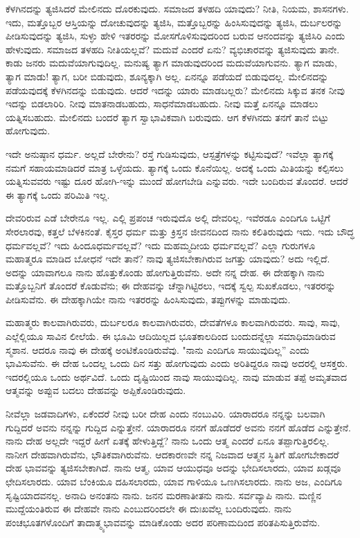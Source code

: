 ಕೆಳಗಿನದನ್ನು ತ್ಯಜಿಸಿದರೆ ಮೇಲಿನದು ದೊರಕುವುದು. ಸಮಾಜದ ತಳಹದಿ ಯಾವುದು? ನೀತಿ, ನಿಯಮ, ಶಾಸನಗಳು. ಇದು, ಮತ್ತೊಬ್ಬರ ಆಸ್ತಿಯನ್ನು ದೋಚುವುದನ್ನು ತ್ಯಜಿಸಿ, ಮತ್ತೊಬ್ಬರನ್ನು ಹಿಂಸಿಸುವುದನ್ನು ತ್ಯಜಿಸಿ, ದುರ್ಬಲರನ್ನು ಪೀಡಿಸುವುದನ್ನು ತ್ಯಜಿಸಿ, ಸುಳ್ಳು ಹೇಳಿ ಇತರರನ್ನು ಮೋಸಗೊಳಿಸುವುದರಿಂದ ಬರುವ ಆನಂದವನ್ನು ತ್ಯಜಿಸಿರಿ ಎಂದು ಹೇಳುವುದು. ಸಮಾಜದ ತಳಹದಿ ನೀತಿಯಲ್ಲವೆ? ಮದುವೆ ಎಂದರೆ ಏನು? ವ್ಯಭಿಚಾರವನ್ನು ತ್ಯಜಿಸುವುದು ತಾನೇ. ಕಾಡು ಜನರು ಮದುವೆಯಾಗುವುದಿಲ್ಲ. ಮನುಷ್ಯ ತ್ಯಾಗ ಮಾಡುವುದರಿಂದ ಮದುವೆಯಾಗುವನು. ತ್ಯಾಗ ಮಾಡು, ತ್ಯಾಗ ಮಾಡು! ತ್ಯಾಗ, ಬರೀ ಬಿಡುವುದು, ಶೂನ್ಯಕ್ಕಾಗಿ ಅಲ್ಲ. ಏನನ್ನೂ ಪಡೆಯದೆ ಬಿಡುವುದಲ್ಲ. ಮೇಲಿನದನ್ನು ಪಡೆಯವುದಕ್ಕೆ ಕೆಳಗಿನದನ್ನು ಬಿಡುವುದು. ಆದರೆ ಇದನ್ನು ಯಾರು ಮಾಡಬಲ್ಲರು? ಮೇಲಿನದು ಸಿಕ್ಕುವ ತನಕ ನೀವು ಇದನ್ನು ಬಿಡಲಾರಿರಿ. ನೀವು ಮಾತನಾಡಬಹುದು, ಸಾಧನೆಮಾಡಬಹುದು. ನೀವು ಮತ್ತೆ ಏನನ್ನೂ ಮಾಡಲು ಯತ್ನಿಸಬಹುದು. ಮೇಲಿನದು ಬಂದರೆ ತ್ಯಾಗ ಸ್ವಾಭಾವಿಕವಾಗಿ ಬರುವುದು. ಆಗ ಕೆಳಗಿನದು ತನಗೆ ತಾನೆ ಬಿಟ್ಟು ಹೋಗುವುದು.

ಇದೇ ಅನುಷ್ಠಾನ ಧರ್ಮ. ಅಲ್ಲದೆ ಬೇರೇನು? ರಸ್ತೆ ಗುಡಿಸುವುದು, ಆಸ್ಪತ್ರೆಗಳನ್ನು ಕಟ್ಟಿಸುವುದೆ? ಇವೆಲ್ಲಾ ತ್ಯಾಗಕ್ಕೆ ನಮಗೆ ಸಹಾಯಮಾಡಿದರೆ ಮಾತ್ರ ಒಳ್ಳೆಯದು. ತ್ಯಾಗಕ್ಕೆ ಒಂದು ಕೊನೆಯಿಲ್ಲ. ಅದಕ್ಕೆ ಒಂದು ಮಿತಿಯನ್ನು ಕಲ್ಪಿಸಲು ಯತ್ನಿಸುವವರು ಇಷ್ಟು ದೂರ ಹೋಗಿ-ಇನ್ನು ಮುಂದೆ ಹೋಗಬೇಡಿ ಎನ್ನುವರು. ಇದೇ ಬಂದಿರುವ ತೊಂದರೆ. ಆದರೆ ಈ ತ್ಯಾಗಕ್ಕೆ ಒಂದು ಪರಿಮಿತಿ ಇಲ್ಲ.

ದೇವರಿರುವ ಎಡೆ ಬೇರೇನೂ ಇಲ್ಲ. ಎಲ್ಲಿ ಪ್ರಪಂಚ ಇರುವುದೊ ಅಲ್ಲಿ ದೇವರಿಲ್ಲ. ಇವೆರಡೂ ಎಂದಿಗೂ ಒಟ್ಟಿಗೆ ಸೇರಲಾರವು, ಕತ್ತಲೆ ಬೆಳಕಿನಂತೆ. ಕೈಸ್ತರ ಧರ್ಮ ಮತ್ತು ಕ್ರಿಸ್ತನ ಜೀವನದಿಂದ ನಾನು ಕಲಿತಿರುವುದು ಇದು. ಇದು ಬೌದ್ಧ ಧರ್ಮವಲ್ಲವೆ? ಇದು ಹಿಂದೂಧರ್ಮವಲ್ಲವೆ? ಇದು ಮಹಮ್ಮದೀಯ ಧರ್ಮವಲ್ಲವೆ? ಎಲ್ಲಾ ಗುರುಗಳೂ ಮಹಾತ್ಮರೂ ಮಾಡಿದ ಬೋಧನೆ ಇದೇ ತಾನೆ? ನಾವು ತ್ಯಜಿಸಬೇಕಾಗಿರುವ ಜಗತ್ತು ಯಾವುದು? ಅದು ಇಲ್ಲಿದೆ. ಅದನ್ನು ಯಾವಾಗಲೂ ನಾನು ಹೊತ್ತುಕೊಂಡು ಹೋಗುತ್ತಿರುವೆನು. ಅದೇ ನನ್ನ ದೇಹ. ಈ ದೇಹಕ್ಕಾಗಿ ನಾನು ಮತ್ತೊಬ್ಬನಿಗೆ ತೊಂದರೆ ಕೊಡುವೆನು; ಈ ದೇಹವನ್ನು ಚೆನ್ನಾಗಿಟ್ಟಿರಲು, ಇದಕ್ಕೆ ಸ್ವಲ್ಪ ಸುಖಕೊಡಲು, ಇತರರನ್ನು ಪೀಡಿಸುವೆನು. ಈ ದೇಹಕ್ಕಾಗಿಯೇ ನಾನು ಇತರರನ್ನು ಹಿಂಸಿಸುವುದು, ತಪ್ಪುಗಳನ್ನು ಮಾಡುವುದು.

ಮಹಾತ್ಮರು ಕಾಲವಾಗಿರುವರು, ದುರ್ಬಲರೂ ಕಾಲವಾಗಿರುವರು, ದೇವತೆಗಳೂ ಕಾಲವಾಗಿರುವರು. ಸಾವು, ಸಾವು, ಎಲ್ಲೆಲ್ಲಿಯೂ ಸಾವಿನ ಲೀಲೆಯೆ. ಈ ಭೂಮಿ ಆದಿಯಿಲ್ಲದ ಭೂತಕಾಲದಿಂದ ಬಂದುದನ್ನೆಲ್ಲಾ ಸಮಾಧಿಮಾಡಿರುವ ಸ್ಮಶಾನ. ಆದರೂ ನಾವು ಈ ದೇಹಕ್ಕೆ ಅಂಟಿಕೊಂಡಿರುವೆವು. "ನಾನು ಎಂದಿಗೂ ಸಾಯುವುದಿಲ್ಲ” ಎಂದು ಭಾವಿಸುವೆನು. ಈ ದೇಹ ಒಂದಲ್ಲ ಒಂದು ದಿನ ಸತ್ತು ಹೋಗುವುದು ಎಂದು ಅರಿತಿದ್ದರೂ ನಾವು ಅದರಲ್ಲಿ ಆಸಕ್ತರು. ಇದರಲ್ಲಿಯೂ ಒಂದು ಅರ್ಥವಿದೆ. ಒಂದು ದೃಷ್ಟಿಯಿಂದ ನಾವು ಸಾಯುವುದಿಲ್ಲ. ನಾವು ಮಾಡುವ ತಪ್ಪೆ ಅಮೃತವಾದ ಆತ್ಮವನ್ನು ಅಪ್ಪುವ ಬದಲು ದೇಹವನ್ನು ಅಪ್ಪಿಕೊಂಡಿರುವುದು.

ನೀವೆಲ್ಲಾ ಜಡವಾದಿಗಳು, ಏಕೆಂದರೆ ನೀವು ಬರೀ ದೇಹ ಎಂದು ನಂಬುವಿರಿ. ಯಾರಾದರೂ ನನ್ನನ್ನು ಬಲವಾಗಿ ಗುದ್ದಿದರೆ ಅವನು ನನ್ನನ್ನು ಗುದ್ದಿದ ಎನ್ನುತ್ತೇನೆ. ಯಾರಾದರೂ ನನಗೆ ಹೊಡೆದರೆ ಅವನು ನನಗೆ ಹೊಡೆದ ಎನ್ನುತ್ತೇನೆ. ನಾನು ದೇಹ ಅಲ್ಲದೇ ಇದ್ದರೆ ಹೀಗೆ ಏತಕ್ಕೆ ಹೇಳುತ್ತಿದ್ದೆ? ನಾನು ಒಂದು ಆತ್ಮ ಎಂದರೆ ಏನೂ ತಪ್ಪಾಗುತ್ತಿರಲಿಲ್ಲ. ನಾನೀಗ ದೇಹವಾಗಿರುವೆನು, ಭೌತಿಕವಾಗಿರುವೆನು. ಆದಕಾರಣವೇ ನನ್ನ ನಿಜವಾದ ಆತ್ಮನ ಸ್ಥಿತಿಗೆ ಹೋಗಬೇಕಾದರೆ ದೇಹ ಭಾವವನ್ನು ತ್ಯಜಿಸಬೇಕಾಗಿದೆ. ನಾನು ಆತ್ಮ, ಯಾವ ಆಯುಧವೂ ಅದನ್ನು ಭೇದಿಸಲಾರದು, ಯಾವ ಖಡ್ಗವೂ ಛೇದಿಸಲಾರದು. ಯಾವ ಬೆಂಕಿಯೂ ದಹಿಸಲಾರದು, ಯಾವ ಗಾಳಿಯೂ ಒಣಗಿಸಲಾರದು. ನಾನು ಅಜ, ಎಂದಿಗೂ ಸೃಷ್ಟಿಯಾದವನಲ್ಲ. ಅನಾದಿ ಅನಂತನು ನಾನು. ಜನನ ಮರಣಾತೀತನು ನಾನು. ಸರ್ವವ್ಯಾಪಿ ನಾನು. ಮಣ್ಣಿನ ಮುದ್ದೆಯಂತಿರುವ ಈ ದೇಹವೇ ನಾನು ಎಂಬುದರಿಂದಲೇ ಈ ದುಃಖವೆಲ್ಲ ಬಂದಿರುವುದು. ನಾನು ಪಂಚಭೂತಗಳೊಂದಿಗೆ ತಾದಾತ್ಮ್ಯಭಾವವನ್ನು ಮಾಡಿಕೊಂಡು ಅದರ ಪರಿಣಾಮದಿಂದ ಪರಿತಪಿಸುತ್ತಿರುವೆನು.

